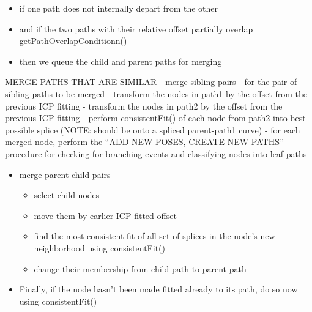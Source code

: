 \begin{itemize}
\begin{itemize}
\begin{itemize}
\end{itemize}

\end{itemize}

\item if one path does not internally depart from the other

\item and if the two paths with their relative offset partially overlap getPathOverlapConditionn()

\item then we queue the child and parent paths for merging

\end{itemize}

MERGE PATHS THAT ARE SIMILAR
- merge sibling pairs
 - for the pair of sibling paths to be merged
 - transform the nodes in path1 by the offset from the previous ICP fitting
 - transform the nodes in path2 by the offset from the previous ICP fitting
 - perform consistentFit() of each node from path2 into best possible splice (NOTE: should be onto a spliced parent-path1 curve)
 - for each merged node, perform the ``ADD NEW POSES, CREATE NEW PATHS'' procedure for checking for branching events and classifying nodes into leaf paths

\begin{itemize}
\item merge parent-child pairs

\begin{itemize}
\item select child nodes

\item move them by earlier ICP-fitted offset

\item find the most consistent fit of all set of splices in the node's new neighborhood using consistentFit()

\item change their membership from child path to parent path

\end{itemize}

\item Finally, if the node hasn't been made fitted already to its path, do so now using consistentFit()

\end{itemize}

